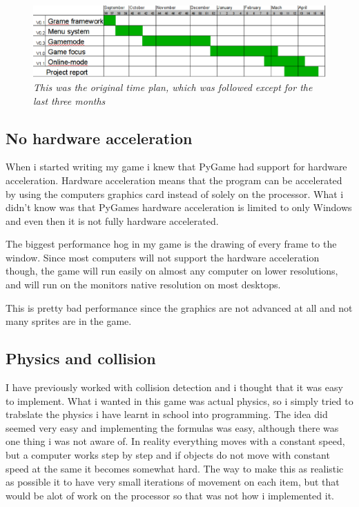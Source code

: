 \documentclass[a4paper,12pt]{article}
\begin{document}
\begin{figure}[h!]
   \includegraphics[width=\textwidth]{img/gantt.eps}
    \emph{%
        This was the original time plan, which was followed except for the last three months
    }
\end{figure}

\subsection{No hardware acceleration}

When i started writing my game i knew that PyGame had support for hardware acceleration. 
Hardware acceleration means that the program can be accelerated by using the computers graphics card instead of solely on the processor.
What i didn't know was that PyGames hardware acceleration is limited to only Windows and even then it is not fully hardware accelerated.

The biggest performance hog in my game is the drawing of every frame to the window.
Since most computers will not support the hardware acceleration though, the game will run easily on almost any computer on lower resolutions, and will run on the monitors native resolution on most desktops.

This is pretty bad performance since the graphics are not advanced at all and not many sprites are in the game.


\subsection{Physics and collision}

I have previously worked with collision detection and i thought that it was easy to implement.
What i wanted in this game was actual physics, so i simply tried to trabslate the physics i have learnt in school into programming.
The idea did seemed very easy and implementing the formulas was easy, although there was one thing i was not aware of.
In reality everything moves with a constant speed, but a computer works step by step and if objects do not move with constant speed at the same it becomes somewhat hard.
The way to make this as realistic as possible it to have very small iterations of movement on each item, but that would be alot of work on the processor so that was not how i implemented it.
\end{document}
